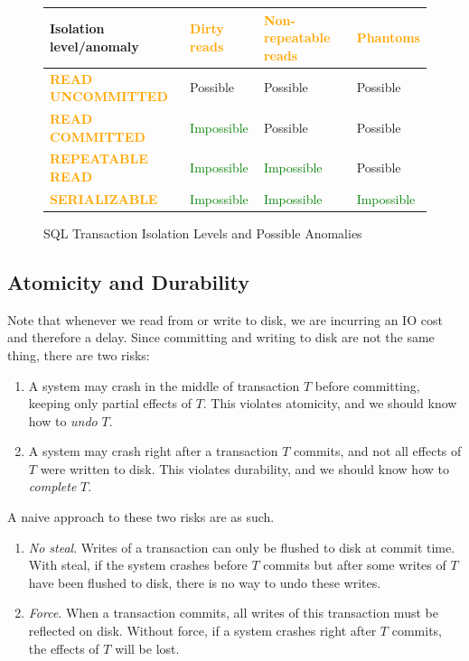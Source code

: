     \begin{figure}[H]
      \centering
      \begin{tabular}{|p{5cm}|p{2cm}|p{4cm}|p{2cm}|}
        \hline
        \textbf{Isolation level/anomaly} & \textcolor{orange}{\textbf{Dirty reads}} & \textcolor{orange}{\textbf{Non-repeatable reads}} & \textcolor{orange}{\textbf{Phantoms}} \\
        \hline
        \textcolor{orange}{\textbf{READ UNCOMMITTED}} & Possible & Possible & Possible \\
        \hline
        \textcolor{orange}{\textbf{READ COMMITTED}} & \textcolor{green}{Impossible} & Possible & Possible \\
        \hline
        \textcolor{orange}{\textbf{REPEATABLE READ}} & \textcolor{green}{Impossible} & \textcolor{green}{Impossible} & Possible \\
        \hline
        \textcolor{orange}{\textbf{SERIALIZABLE}} & \textcolor{green}{Impossible} & \textcolor{green}{Impossible} & \textcolor{green}{Impossible} \\
        \hline
      \end{tabular}
      \caption{SQL Transaction Isolation Levels and Possible Anomalies}
      \label{fig:isolation-levels}
    \end{figure}


\subsection{Atomicity and Durability} 

    Note that whenever we read from or write to disk, we are incurring an IO cost and therefore a delay. Since committing and writing to disk are not the same thing, there are two risks: 
    \begin{enumerate}
      \item A system may crash in the middle of transaction $T$ before committing, keeping only partial effects of $T$. This violates atomicity, and we should know how to \textit{undo} $T$. 
      \item A system may crash right after a transaction $T$ commits, and not all effects of $T$ were written to disk. This violates durability, and we should know how to \textit{complete} $T$. 
    \end{enumerate} 

    \begin{example}
      \label{ex:no-steal-and-force}
      A naive approach to these two risks are as such.  
      \begin{enumerate}
        \item \textit{No steal}. Writes of a transaction can only be flushed to disk at commit time. With steal, if the system crashes before $T$ commits but after some writes of $T$ have been flushed to disk, there is no way to undo these writes. 
        \item \textit{Force}. When a transaction commits, all writes of this transaction must be reflected on disk. Without force, if a system crashes right after $T$ commits, the effects of $T$ will be lost. 
      \end{enumerate}
    \end{example}

